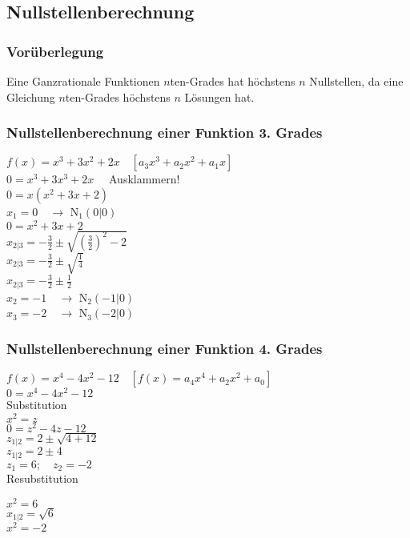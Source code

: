 \subsection{Nullstellenberechnung}
\subsubsection{Vorüberlegung}
Eine Ganzrationale Funktionen $n$ten-Grades hat höchstens $n$ Nullstellen, da eine Gleichung $n$ten-Grades höchstens $n$
Lösungen hat.

\subsubsection{Nullstellenberechnung einer Funktion 3. Grades}
$f(x)=x^3+3x^2+2x\quad[a_3x^3+a_2x^2+a_1x]$\\
$0=x^3+3x^3+2x\quad$ Ausklammern!\\
$0=x(x^2+3x+2)$\\
$x_1=0\quad\rightarrow$ N$_1(0|0)$\\
$0=x^2+3x+2$\\
$x_{2|3}=-\frac{3}{2}\pm \sqrt{(\frac{3}{2})^2-2}$\\
$x_{2|3}=-\frac{3}{2}\pm \sqrt{\frac{1}{4}}$\\
$x_{2|3}=-\frac{3}{2}\pm \frac{1}{2}$\\
$x_2=-1\quad\rightarrow$ N$_2(-1|0)$\\
$x_3=-2\quad\rightarrow$ N$_3(-2|0)$\\

\subsubsection{Nullstellenberechnung einer Funktion 4. Grades}
$f(x)=x^4-4x^2-12\quad [f(x)=a_4x^4+a_2x^2+a_0]$\\
$0=x^4-4x^2-12$\\
Substitution\\
$x^2=z$\\
$0=z^2-4z-12$\\
$z_{1|2}=2\pm \sqrt{4+12}$\\
$z_{1|2}=2\pm 4$\\
$z_1=6;\quad z_2=-2$\\
Resubstitution\\
\begin{multicols}{2}
$x^2=6$\\
$x_{1|2}=\sqrt{6}$\\
$x^2=-2$\\
\textdiscount
\end{multicols}

